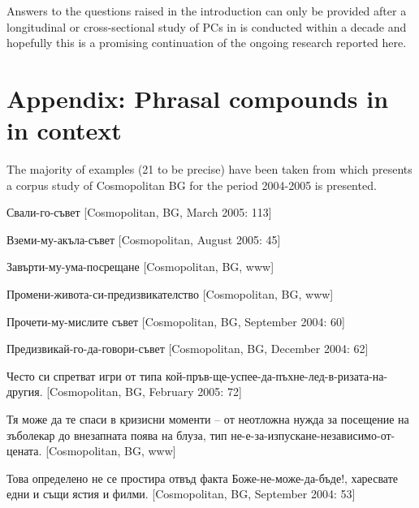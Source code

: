 \documentclass[output=paper]{LSP/langsci}
\begin{document}
Answers to the questions raised in the introduction can only be provided after a longitudinal or cross-sectional study of PCs in  is conducted within a decade and hopefully this is a promising continuation of the ongoing research reported here.


\section*{Appendix: Phrasal compounds in  in context}\label{sec:bagasheva:6.1}


The majority of examples (21 to be precise) have been taken from \citet{Boyadžieva2007} which presents a corpus study of Cosmopolitan BG for the period 2004-2005 is presented.



\ea%
    \label{ex:bagasheva:1} 

         {{{Свали-го-съвет}}} [Cosmopolitan, BG, March 2005: 113]
    \z



\ea%
    \label{ex:bagasheva:2} 
         {{{Вземи}}}{{-}}{{{му}}}{{-{акъла-съвет}}}{ }[Cosmopolitan, August 2005: 45]
    \z



\ea
{{{Завърти-}}}{{{му}}}{{-{ума-посрещане}}}{ }{[Cosmopolitan, BG, www]}
\z


\ea
{{Промени-живота-си-предизвикателство}}{ }{[Cosmopolitan, BG, www]}
\z


\ea%
    \label{ex:bagasheva:5} 

         {{{Прочети-}}}{{{му}}}{{-{мислите съвет} }}[Cosmopolitan, BG, September 2004: 60]
    \z



\ea%
    \label{ex:bagasheva:6} 

         {{{Предизвикай-го-да-говори-съвет}}}{ }[Cosmopolitan, BG, December 2004: 62]
\z


\ea 
{{{Често си спретват игри от} типа кой-пръв-ще-успее}-{да-пъхне-лед-в-ризата-на-другия}}{. }{[Cosmopolitan, BG, February 2005: 72]}
\z



\ea
{{Тя може да те спаси в кризисни моменти – от неотложна нужда за посещение на зъболекар до внезапната поява на блуза,} }{{{тип не-е-за-изпускане-независимо-от-цената}}}{. }{[Cosmopolitan, BG, www]}
\z


\ea
{{Това определено не се простира отвъд} }{{{факта Боже-не-може-да-бъде}}!, {харесвате едни и същи ястия и филми.}}{ [Cosmopolitan, BG, September 2004: 53]}
\z
\end{document}

